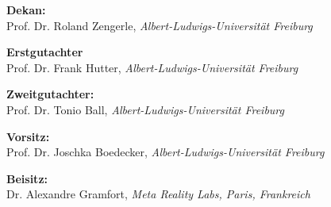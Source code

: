  
\thispagestyle{empty}

\hfill

\vfill


  \begin{flushleft}
    \noindent
    \textbf{Dekan:}\\
    Prof. Dr. Roland Zengerle, \emph{Albert-Ludwigs-Universität Freiburg}\\

    \bigskip

    \noindent
    \textbf{Erstgutachter}\\
    Prof. Dr. Frank Hutter, \emph{Albert-Ludwigs-Universität Freiburg}\\

    \bigskip

    \noindent
    \textbf{Zweitgutachter:}\\
    Prof. Dr. Tonio Ball,  \emph{Albert-Ludwigs-Universität Freiburg}\\

    \bigskip

    \noindent
    \textbf{Vorsitz:}\\
    Prof. Dr. Joschka Boedecker,  \emph{Albert-Ludwigs-Universität Freiburg}\\

    \bigskip

    \noindent
    \textbf{Beisitz:}\\
    Dr. Alexandre Gramfort,  \emph{Meta Reality Labs, Paris, Frankreich}\\

    \bigskip



    

  \end{flushleft}

%
%
%
%
%
